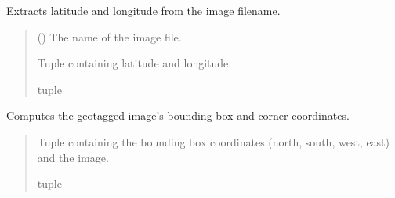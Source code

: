 \documentclass[letterpaper,10pt,english]{sphinxmanual}
\begin{document}

\begin{fulllineitems}
\label{\detokenize{index:georef.Geotagger.name2latlong}}
\pysigstartsignatures
{}
\pysigstopsignatures
\sphinxAtStartPar
Extracts latitude and longitude from the image filename.
\begin{quote}\begin{description}
\sphinxAtStartPar
{} () \textendash{} The name of the image file.

\sphinxAtStartPar
Tuple containing latitude and longitude.

\sphinxAtStartPar
tuple

\end{description}\end{quote}

\end{fulllineitems}


\begin{fulllineitems}
\label{\detokenize{index:georef.Geotagger.getcoord}}
\pysigstartsignatures
{}
\pysigstopsignatures
\sphinxAtStartPar
Computes the geotagged image’s bounding box and corner coordinates.
\begin{quote}\begin{description}
\sphinxAtStartPar
{} \textendash{} 

\sphinxAtStartPar
Tuple containing the bounding box coordinates (north, south, west, east) and the image.

\sphinxAtStartPar
tuple

\end{description}\end{quote}

\end{fulllineitems}
\end{document}
